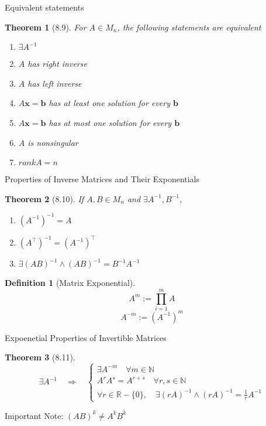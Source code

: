 \documentclass[final]{beamer}
\newtheorem{defn}{Definition}
\newtheorem{thm}{Theorem}
\begin{document}
\begin{frame}[t]{Equivalent statements}
	\begin{thm}
		[8.9] For $A\in M_n$, the following statements are equivalent
		\begin{enumerate}
			\item $\exists A^{-1}$
			\item $A$ has right inverse
			\item $A$ has left inverse
			\item $A\mathbf{x}=\mathbf{b}$ has at least one solution for every $\mathbf{b}$
			\item $A\mathbf{x}=\mathbf{b}$ has at most one solution for every $\mathbf{b}$
			\item $A$ is nonsingular
			\item $rank A = n$
		\end{enumerate}
	\end{thm}
\end{frame}

\begin{frame}[t]{Properties of Inverse Matrices and Their Exponentials}
	\begin{thm}
		[8.10] If $A,B\in M_n$ and $\exists A^{-1}, B^{-1}$,
		\begin{enumerate}
			\item $(A^{-1})^{-1}=A$
			\item $(A^\intercal)^{-1}=(A^{-1})^\intercal$
			\item $\exists(AB)^{-1} \land (AB)^{-1}=B^{-1}A^{-1}$
		\end{enumerate}
	\end{thm}
	\begin{defn}
		[Matrix Exponential]
		\[
			A^m := \prod_{i=1}^m A
		\]\[
			A^{-m} := (A^{-1})^m
		\]
	\end{defn}
\end{frame}

\begin{frame}[t]{Expoenetial Properties of Invertible Matrices}
	\begin{thm}
		[8.11] \[
			\exists A^{-1} \quad\Rightarrow\quad \begin{cases}
				\exists A^{-m} \quad\forall m\in\mathbb{N}\\
				A^rA^s = A^{r+s}\quad\forall r,s\in\mathbb{N}\\
				\forall r\in\mathbb{R}-\{0\}, \quad \exists(rA)^{-1}\land (rA)^{-1}=\frac{1}{r}A^{-1}
			\end{cases}
		\]
	\end{thm}
	Important Note: $(AB)^k\neq A^k B^k$
\end{frame}
\end{document}
